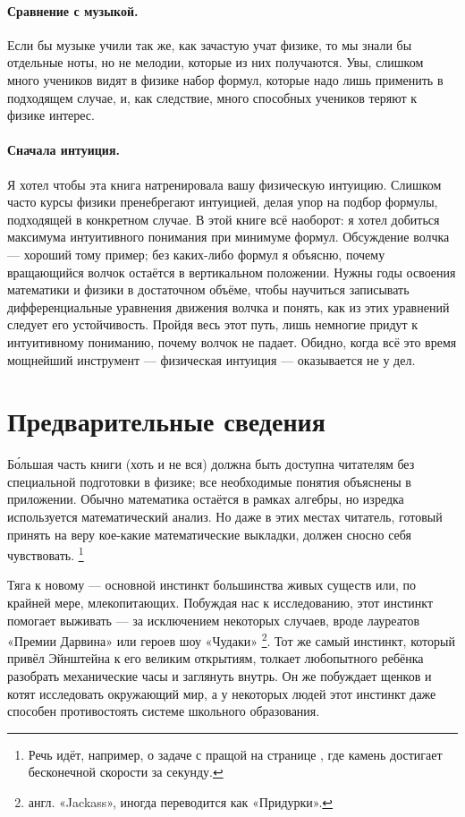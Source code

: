 \paragraph{Сравнение с музыкой.}
Если бы музыке учили так же, как зачастую учат физике, то мы знали бы отдельные ноты, но не мелодии, которые из них получаются.
Увы, слишком много учеников видят в физике набор формул, которые надо лишь применить в подходящем случае, и,
как следствие, много способных учеников теряют к физике интерес.

\paragraph{Сначала интуиция.}
Я хотел чтобы эта книга натренировала вашу физическую интуицию.
Слишком часто курсы физики пренебрегают интуицией, делая упор на подбор формулы, подходящей в конкретном случае.
В этой книге всё наоборот:
я хотел добиться максимума интуитивного понимания при минимуме формул.
Обсуждение волчка --- хороший тому пример;
без каких-либо формул я объясню, почему вращающийся волчок остаётся в вертикальном положении.
Нужны годы освоения математики и физики в достаточном объёме, чтобы научиться записывать дифференциальные уравнения движения волчка и понять, как из этих уравнений следует его устойчивость.
Пройдя весь этот путь, лишь немногие придут к интуитивному пониманию, почему волчок не падает.
Обидно, когда всё это время мощнейший инструмент --- физическая интуиция --- оказывается не у дел.

\section{Предварительные сведения}

Б\'{о}льшая часть книги (хоть и не вся) должна быть доступна читателям без специальной подготовки в физике;
все необходимые понятия объяснены в приложении.
Обычно математика остаётся в рамках алгебры, но изредка используется математический анализ.
Но даже в этих местах читатель, готовый принять на веру кое-какие математические выкладки, должен сносно себя чувствовать.%
\footnote{Речь идёт, например, о задаче с пращой на странице \pageref{Задача Давида и Голиафа}, где камень достигает бесконечной скорости за секунду.}

Тяга к новому --- основной инстинкт большинства живых существ или, по крайней мере, млекопитающих.
Побуждая нас к исследованию, этот инстинкт помогает выживать --- за исключением некоторых случаев, вроде лауреатов «Премии Дарвина» или героев шоу «Чудаки»%
\footnote{англ. «Jackass», иногда переводится как «Придурки». \pr}.
Тот же самый инстинкт, который привёл Эйнштейна к его великим открытиям, толкает любопытного ребёнка разобрать механические часы и заглянуть внутрь.
Он же побуждает щенков и котят исследовать окружающий мир,
а у некоторых людей этот инстинкт даже способен противостоять системе школьного образования.

